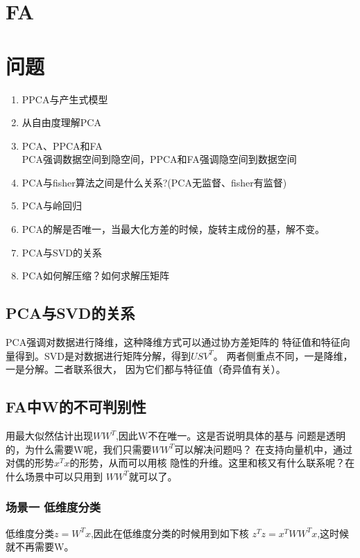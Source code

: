 \section{FA}

\section{问题}
\begin{enumerate}
\item PPCA与产生式模型
\item 从自由度理解PCA
\item PCA、PPCA和FA\\
PCA强调数据空间到隐空间，PPCA和FA强调隐空间到数据空间
\item PCA与fisher算法之间是什么关系?(PCA无监督、fisher有监督)
\item PCA与岭回归
\item PCA的解是否唯一，当最大化方差的时候，旋转主成份的基，解不变。
\item PCA与SVD的关系
\item PCA如何解压缩？如何求解压矩阵
\end{enumerate}
\subsection{PCA与SVD的关系}
PCA强调对数据进行降维，这种降维方式可以通过协方差矩阵的
特征值和特征向量得到。SVD是对数据进行矩阵分解，得到$USV^T$。
两者侧重点不同，一是降维，一是分解。二者联系很大，
因为它们都与特征值（奇异值有关）。
\subsection{FA中W的不可判别性}
用最大似然估计出现$WW^T$,因此W不在唯一。这是否说明具体的基与
问题是透明的，为什么需要W呢，我们只需要$WW^T$可以解决问题吗？
在支持向量机中，通过对偶的形势$x^Tx$的形势，从而可以用核
隐性的升维。这里和核又有什么联系呢？在什么场景中可以只用到
$WW^T$就可以了。

\subsubsection{场景一 低维度分类}
低维度分类$z = W^Tx$,因此在低维度分类的时候用到如下核
$z^Tz = x^TWW^Tx$,这时候就不再需要W。 


